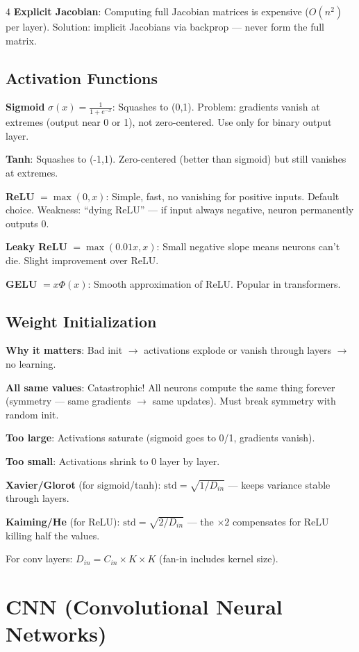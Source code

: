 \documentclass[6pt,landscape,a4paper]{extarticle}
\begin{document}
\begin{multicols}{4}
\textbf{Explicit Jacobian}: Computing full Jacobian matrices is expensive ($O(n^2)$ per layer). Solution: implicit Jacobians via backprop --- never form the full matrix.

\subsection{Activation Functions}
\textbf{Sigmoid} $\sigma(x)=\frac{1}{1+e^{-x}}$: Squashes to (0,1). Problem: gradients vanish at extremes (output near 0 or 1), not zero-centered. Use only for binary output layer.

\textbf{Tanh}: Squashes to (-1,1). Zero-centered (better than sigmoid) but still vanishes at extremes.

\textbf{ReLU} $=\max(0,x)$: Simple, fast, no vanishing for positive inputs. Default choice. Weakness: ``dying ReLU'' --- if input always negative, neuron permanently outputs 0.

\textbf{Leaky ReLU} $=\max(0.01x, x)$: Small negative slope means neurons can't die. Slight improvement over ReLU.

\textbf{GELU} $=x\Phi(x)$: Smooth approximation of ReLU. Popular in transformers.

\subsection{Weight Initialization}
\textbf{Why it matters}: Bad init $\to$ activations explode or vanish through layers $\to$ no learning.

\textbf{All same values}: Catastrophic! All neurons compute the same thing forever (symmetry --- same gradients $\to$ same updates). Must break symmetry with random init.

\textbf{Too large}: Activations saturate (sigmoid goes to 0/1, gradients vanish).

\textbf{Too small}: Activations shrink to 0 layer by layer.

\textbf{Xavier/Glorot} (for sigmoid/tanh): $\text{std} = \sqrt{1/D_{in}}$ --- keeps variance stable through layers.

\textbf{Kaiming/He} (for ReLU): $\text{std} = \sqrt{2/D_{in}}$ --- the $\times 2$ compensates for ReLU killing half the values.

For conv layers: $D_{in} = C_{in} \times K \times K$ (fan-in includes kernel size).

\section{CNN (Convolutional Neural Networks)}


\end{multicols}
\end{document}
